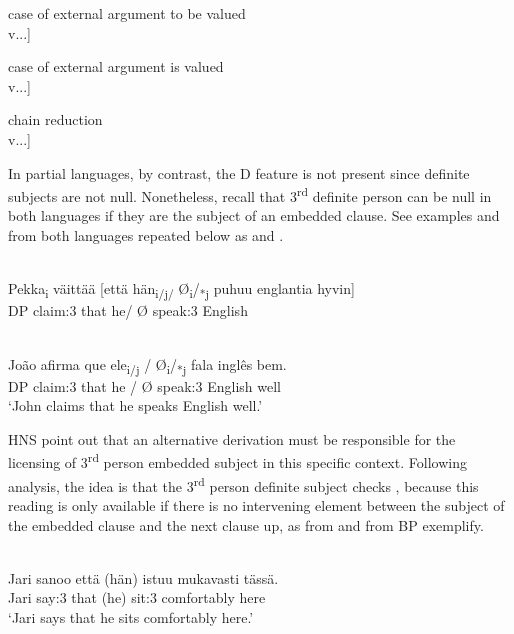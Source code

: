\documentclass[output=paper]{LSP/langsci}
\begin{document}
\ea\label{ex:33.alexiadou}
case of external argument to be valued\\\relax
[T, D\textsubscript{k,} uϕ, NOM] [vP [3\textsc{sg}, uCase] v...]
\z

\ea\label{ex:34.alexiadou}
case of external argument is valued\\\relax
[T, D\textsubscript{k,} 3\textsc{sg}, NOM] [vP [3\textsc{sg}, NOM] v...]
\z

\ea\label{ex:35.alexiadou}
chain reduction\\\relax
[T, D\textsubscript{k,} 3\textsc{sg}, NOM] [vP [\st{3\textsc{sg}, NOM}] v...]
\z


In partial  languages, by contrast, the D feature is not present since definite subjects are not null. Nonetheless, recall that 3\textsuperscript{rd} definite person can be null in both languages if they are the subject of an embedded clause. See examples  and  from both languages repeated below as  and .

\ea\label{ex:36.alexiadou}
\\
\gll Pekka\textsubscript{i} väittää [että hän\textsubscript{i/j/} Ø\textsubscript{i}/\textsubscript{*j} puhuu englantia hyvin]\\
 DP claim:3 that he/ Ø speak:3 English\\
\glt
\z

\ea\label{ex:37.alexiadou}
\\
\gll João afirma que ele\textsubscript{i/j} / Ø\textsubscript{i}/\textsubscript{*j} fala inglês bem.\\
 DP claim:3 that he / Ø speak:3 English well\\
\glt ‘John claims that he speaks English well.’
\z


HNS point out that an alternative derivation must be responsible for the licensing of 3\textsuperscript{rd} person embedded subject in this specific context. Following  analysis, the idea is that the 3\textsuperscript{rd} person definite subject checks , because this reading is only available if there is no intervening element between the subject of the embedded clause and the next clause up, as  from  and  from BP exemplify.


\ea\label{ex:38.alexiadou}
\\
\gll Jari sanoo että (hän) istuu mukavasti tässä.\\
 Jari say:3 that (he) sit:3 comfortably here\\
\glt ‘Jari says that he sits comfortably here.’
\z
\end{document}
